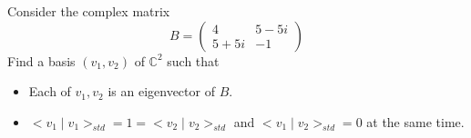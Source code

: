 \documentclass[11pt]{article}
\newenvironment{problem}[2][Problem\!]{\begin{trivlist}
\item[\hskip \labelsep {\bfseries #1}\hskip \labelsep {\bfseries #2}]}{\end{trivlist}}
\newcommand{\cc}{\mathbb C}   %
\begin{document}
\begin{tcolorbox}
    \begin{problem}{2}
        Consider the complex matrix \[B = \begin{pmatrix}
            4 & 5-5i \\ 
            5 + 5i & -1
        \end{pmatrix}\]
        Find a basis $(v_1, v_2)$ of $\cc^{2}$ such that 
        \begin{itemize}
            \item[(a)] Each of $v_1, v_2$ is an eigenvector of $B$.
            \item[(b)] $<v_1\mid v_1>_{std} = 1 = <v_2 \mid v_2>_{std}$ and $<v_1 \mid v_2>_{std} = 0$ at the same time.
        \end{itemize}
    \end{problem}
\end{tcolorbox}
\end{document}

